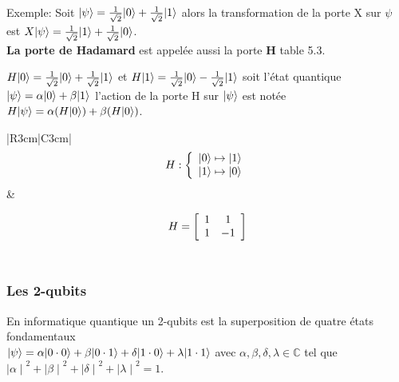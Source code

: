 \documentclass[12pt,openany]{report}
\DeclarePairedDelimiter\ket{\lvert}{\rangle}
\begin{document}
Exemple:\vspace{0.5cm} Soit $\ket{\psi}=\frac{1}{\sqrt{2}}\ket{0}  + \frac{1}{\sqrt{2}}\ket{1}$ alors la transformation de la porte X sur $\psi  $ est $ X \ket{\psi}= \frac{1}{\sqrt{2}}\ket{1}  + \frac{1}{\sqrt{2}}\ket{0} $.\\

\textbf{La porte de Hadamard} est appelée aussi la porte \textbf{H} table 5.3.

$ H \ket{0}=\frac{1}{\sqrt{2}}\ket{0}+ \frac{1}{\sqrt{2}}\ket{1} $ et $ H \ket{1}=\frac{1}{\sqrt{2}}\ket{0}- \frac{1}{\sqrt{2}}\ket{1} $ soit l'état quantique $ \ket{\psi}=\alpha \ket{0}+\beta \ket{1}  $ l'action de la porte H sur $\ket{\psi}$ est notée $ H\ket{\psi}=\alpha (H\ket{0})+ \beta (H\ket{0}) $.
\begin{table}
\centering
\begin{tabular}{|R{3cm}|C{3cm}|}
\hline
\[ H:
\left \{
\begin{array}{c c}
\ket{0}\mapsto \ket{1} \\
\ket{1} \mapsto \ket{0}
  
\end{array}
\right.
\]
&

\[ H=
\left[ 
\begin{array}{c c}
1 & 1 \\
1 & -1
  
\end{array}
\right]
\] \\

\hline


\end{tabular}
\caption{ Les porte de Hadamard }\cite{Rap}
\label{tabHadamard}
\end{table}

\subsubsection{Les 2-qubits}
En informatique quantique un 2-qubits est la superposition de quatre états fondamentaux\\
$ \ket{\psi}=\alpha \ket{0\cdot 0} + \beta \ket{0\cdot 1} + \delta \ket{1 \cdot 0} + \lambda \ket{1\cdot 1} $ avec $ \alpha,  \beta,\delta,\lambda \in \mathbb{C}   $ tel que ${\mid \alpha \mid}^2 + {\mid \beta \mid}^2 + {\mid \delta \mid}^2+ {\mid \lambda \mid}^2 =1$.\\
\end{document}
